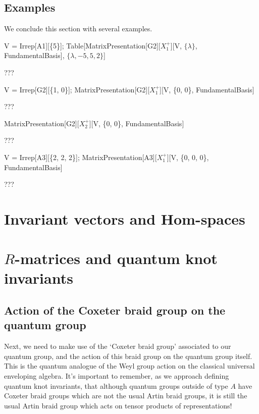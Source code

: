 \subsection{Examples}
We conclude this section with several examples.

\begin{mma}
\begin{inm}V = Irrep[A1][\{5\}];
Table[MatrixPresentation[G2][$X_1^+$][V, $\{\lambda\}$, FundamentalBasis], $\{\lambda, -5, 5, 2\}$]\end{inm}
\begin{outm}???\end{outm}
\begin{inm}V = Irrep[G2][\{1, 0\}];
MatrixPresentation[G2][$X_1^+$][V, \{0, 0\}, FundamentalBasis]\end{inm}
\begin{outm}???\end{outm}
\begin{inm}MatrixPresentation[G2][$X_2^+$][V, \{0, 0\}, FundamentalBasis]\end{inm}
\begin{outm}???\end{outm}
\begin{inm}V = Irrep[A3][\{2, 2, 2\}];
MatrixPresentation[A3][$X_1^+$][V, \{0, 0, 0\}, FundamentalBasis]\end{inm}
\begin{outm}???\end{outm}
\end{mma}


\section{Invariant vectors and Hom-spaces}


\section{$R$-matrices and quantum knot invariants}
\subsection{Action of the Coxeter braid group on the quantum group}
Next, we need to make use of the `Coxeter braid group' associated to our quantum group, and the action of this braid group on the quantum group itself.
This is the quantum analogue of the Weyl group action on the classical universal enveloping algebra. It's important to remember,
as we approach defining quantum knot invariants, that although quantum groups outside of type $A$ have Coxeter braid groups which are not
the usual Artin braid groups, it is still the usual Artin braid group which acts on tensor products of representations!

